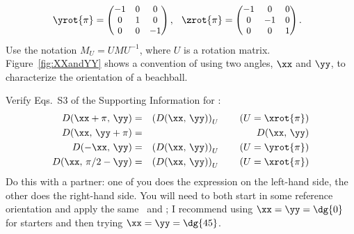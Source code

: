 \documentclass[11pt,titlepage,fleqn]{article}
\begin{document}
\begin{enumerate}
\begin{equation*}
\yrot{\pi}=\begin{small}\begin{pmatrix}-1 & 0 & 0 \\
                                       0 & 1 & 0      \\
                                       0 & 0 & -1\end{pmatrix}\end{small},\:\:\;
\zrot{\pi}=\begin{small}\begin{pmatrix}   -1 & 0 & 0 \\
                                          0 & -1 & 0 \\
                                          0  & 0 & 1\end{pmatrix}\end{small}.\:\:\:
\label{eq:DefXxiYxiZxi}
\end{equation*}
%
Use the notation $M_U=UMU^{-1}$, where $U$ is a rotation matrix. Figure~\ref{fig:XXandYY} shows a convention of using two angles, $\xx$ and $\yy$, to characterize the orientation of a beachball.

Verify Eqs.~S3 of the Supporting Information for \citet{TapeTape2013}:
%
\begin{eqnarray}
D(\xx+\pi,\,\yy)&=&\left(D(\xx,\,\yy)\right)_U\hspace{20pt}(U=\xrot{\pi})
\label{eq1}
\\
D(\xx,\,\yy+\pi)&=&D(\xx,\,\yy)
\label{eq2}
\\
D(-\xx,\,\yy)&=&\left(D(\xx,\,\yy)\right)_U\hspace{20pt}(U=\yrot{\pi})
\label{eq3}
\\
D(\xx,\,\pi/2-\yy)&=&\left(D(\xx,\,\yy)\right)_U\hspace{20pt}(U=\xrot{\pi})
\label{eq4}
\end{eqnarray}
%
Do this with a partner: one of you does the expression on the left-hand side, the other does the right-hand side. You will need to both start in some reference orientation and apply the same \xx\ and \yy; I recommend using $\xx=\yy=\dg{0}$ for starters and then trying $\xx=\yy=\dg{45}$.

\end{enumerate}

\end{document}
